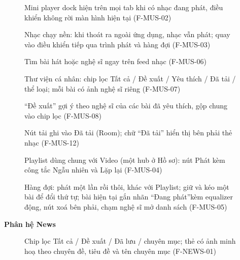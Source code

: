 \begin{figure}[H]
\centering
{}
\caption{\small Mini player dock hiện trên mọi tab khi có nhạc đang phát, điều khiển không rời màn hình hiện tại (F-MUS-02)}
\end{figure}
\begin{figure}[H]
\centering
{}
\caption{\small Nhạc chạy nền: khi thoát ra ngoài ứng dụng, nhạc vẫn phát; quay vào điều khiển tiếp qua trình phát và hàng đợi (F-MUS-03)}
\end{figure}
\begin{figure}[H]
\centering
{}
\caption{\small Tìm bài hát hoặc nghệ sĩ ngay trên feed nhạc (F-MUS-06)}
\end{figure}
\begin{figure}[H]
\centering
{}
\caption{\small Thư viện cá nhân: chip lọc Tất cả / Đề xuất / Yêu thích / Đã tải / thể loại; mỗi bài có ảnh nghệ sĩ riêng (F-MUS-07)}
\end{figure}
\begin{figure}[H]
\centering
{}
\caption{\small ``Đề xuất'' gợi ý theo nghệ sĩ của các bài đã yêu thích, gộp chung vào chip lọc (F-MUS-08)}
\end{figure}
\begin{figure}[H]
\centering
{}
\caption{\small Nút tải ghi vào Đã tải (Room); chữ ``Đã tải'' hiển thị bên phải thẻ nhạc (F-MUS-12)}
\end{figure}
\begin{figure}[H]
\centering
{}
\caption{\small Playlist dùng chung với Video (một hub ở Hồ sơ): nút Phát kèm công tắc Ngẫu nhiên và Lặp lại (F-MUS-04)}
\end{figure}
\begin{figure}[H]
\centering
{}
\caption{\small Hàng đợi: phát một lần rồi thôi, khác với Playlist; giữ và kéo một bài để đổi thứ tự; bài hiện tại gắn nhãn ``Đang phát''kèm equalizer động, nút xoá bên phải, chạm nghệ sĩ mở danh sách (F-MUS-05)}
\end{figure}
\textbf{Phân hệ News}\\[6pt]
\begin{figure}[H]
\centering
{}
\caption{\small Chip lọc Tất cả / Đề xuất / Đã lưu / chuyên mục; thẻ có ảnh minh hoạ theo chuyên đề, tiêu đề và tên chuyên mục (F-NEWS-01)}
\end{figure}
